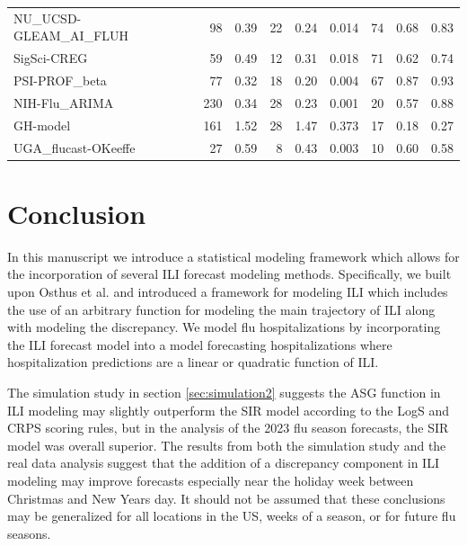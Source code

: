 \begin{table}[ht]
\begin{adjustwidth}{-3cm}{-1.5cm}
\begin{tabular}{lrrrrrrrr}
  NU\_UCSD-GLEAM\_AI\_FLUH & 98 & 0.39 & 22 & 0.24 & 0.014 & 74 & 0.68 & 0.83 \\ 
  SigSci-CREG & 59 & 0.49 & 12 & 0.31 & 0.018 & 71 & 0.62 & 0.74 \\ 
  PSI-PROF\_beta & 77 & 0.32 & 18 & 0.20 & 0.004 & 67 & 0.87 & 0.93 \\ 
  NIH-Flu\_ARIMA & 230 & 0.34 & 28 & 0.23 & 0.001 & 20 & 0.57 & 0.88 \\ 
  GH-model & 161 & 1.52 & 28 & 1.47 & 0.373 & 17 & 0.18 & 0.27 \\ 
  UGA\_flucast-OKeeffe & 27 & 0.59 & 8 & 0.43 & 0.003 & 10 & 0.60 & 0.58 \\  
\end{tabular}
\end{adjustwidth}
\label{tab:fin_analysis_stats}
\end{table}










\section{Conclusion}
\label{sec:conclusion}

 In this manuscript we introduce a statistical modeling framework which allows 
 for the incorporation of several ILI forecast modeling methods. Specifically, 
 we built upon Osthus et al. \cite[]{osthus2019dynamic} and introduced a 
 framework for modeling ILI which includes the use of an arbitrary function 
 for modeling the main trajectory of ILI along with modeling the discrepancy. 
 We model flu hospitalizations by incorporating the ILI forecast model into a 
 model forecasting hospitalizations where hospitalization predictions are a 
 linear or quadratic function of ILI.

The simulation study in section \ref{sec:simulation2} suggests the ASG 
function in ILI modeling may slightly outperform the SIR model according to 
the LogS and CRPS scoring rules, but in the analysis of the 2023 flu season 
forecasts, the SIR model was overall superior. The results from both the 
simulation study and the real data analysis suggest that the addition of a 
discrepancy component in ILI modeling may improve forecasts especially near 
the holiday week between Christmas and New Years day. It should not be assumed 
that these conclusions may be generalized for all locations in the US, weeks 
of a season, or for future flu seasons. 

